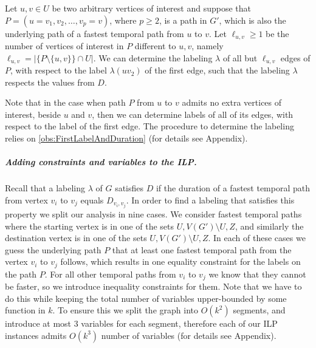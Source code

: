 \documentclass[a4paper,UKenglish,cleveref, autoref, thm-restate,anonymous]{lipics-v2021}
\begin{document}
	\begin{lemma}[$\star$]\label{lemma:FPT-uv-LabelAlmostalledges}
		Let $u, v \in U$ be two arbitrary vertices of interest and suppose that $P = (u=v_1, v_2, \dots, v_p = v)$, where $p \geq 2$, 
		is a path in $G'$, which is also the underlying path of a fastest temporal path from $u$ to $v$.
		Let $\ell_{u,v} \geq 1$ be the number of vertices of interest in $P$ different to $u,v$, namely $\ell_{u,v} = |\{P \setminus \{u,v \} \} \cap U |$.
		We can determine the labeling $\lambda$ of all but $\ell_{u,v}$ edges of $P$, with respect to the label $\lambda(uv_2)$ of the first edge,
		such that the labeling $\lambda$ respects the values from $D$.
	\end{lemma}
    Note that in the case when path $P$ from $u$ to $v$ admits no extra vertices of interest, beside $u$ and $v$, then we can determine labels of all of its edges, with respect to the label of the first edge. 
    The procedure to determine the labeling relies on \cref{obs:FirstLabelAndDuration} (for details see Appendix).

\subparagraph{Adding constraints and variables to the ILP.}

Recall that a labeling $\lambda$ of $G$ satisfies $D$ if the duration of a fastest temporal path from vertex $v_i$ to $v_j$ equals $D_{v_i, v_j}$.
In order to find a labeling that satisfies this property we split our analysis in nine cases.
We consider fastest temporal paths 
where the starting vertex is in one of the sets $U,V(G') \setminus U, Z$,
and similarly the destination vertex is in one of the sets $U,V(G') \setminus U, Z$.
In each of these cases we guess the underlying path $P$ that at least one fastest temporal path from the vertex $v_i$ to $v_j$ follows, 
which results in one equality constraint for the labels on the path $P$. 
For all other temporal paths from $v_i$ to $v_j$ we know that they cannot be faster, so we introduce inequality constraints for them.
Note that we have to do this while keeping the total number of variables upper-bounded by some function in $k$.
To ensure this 
we split the graph into $O(k^2)$ segments, and introduce at most $3$ variables for each segment,
therefore each of our ILP instances admits $O(k^3)$ number of variables (for details see Appendix).
\end{document}

